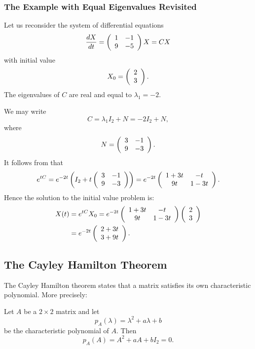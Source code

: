 \documentclass{ximera}
\begin{document}
\subsubsection*{The Example with Equal Eigenvalues Revisited}

Let us reconsider the system of differential equations 
\[
\frac{dX}{dt} = \left(\begin{array}{rr} 1 & -1\\ 9 &-5\end{array}\right) X = CX
\]
with initial value
\[
X_0 = \left(\begin{array}{r} 2 \\ 3\end{array}\right).
\]
The eigenvalues of $C$ are real and equal to $\lambda_1=-2$.

We may write
\[
C = \lambda_1 I_2 + N = -2I_2+N,
\]
where
\[
N = \left(\begin{array}{rr} 3 & -1\\ 9 &-3\end{array}\right).
\]
It follows from  that
\begin{equation}  \label{e:solntob}
e^{tC} =  e^{-2t}\left(I_2+t\left(\begin{array}{rr} 3 & -1\\ 9 &-3\end{array}\right)\right)
= e^{-2t}\left(\begin{array}{cc} 1+3t & -t\\ 9t &1-3t\end{array}\right).
\end{equation}
Hence the solution to the initial value problem is:
\begin{align*}
X(t) &= e^{tC}X_0 = e^{-2t}\left(\begin{array}{cc} 1+3t & -t\\ 9t &1-3t\end{array}\right)\left(\begin{array}{r} 2 \\ 3\end{array}\right) \\
  &= e^{-2t}\left(\begin{array}{r} 2+3t \\ 3+9t\end{array}\right).
\end{align*}

\subsection*{The Cayley Hamilton Theorem} 

The Cayley Hamilton theorem states that a matrix satisfies its own
characteristic polynomial.  More precisely:
\begin{theorem} \label{T:CH2}
Let $A$ be a $2\times 2$ matrix and let
\[
p_A(\lambda) = \lambda^2 + a\lambda + b
\]
be the characteristic polynomial of $A$.  Then
\[
p_A(A) = A^2 + aA + bI_2 = 0.
\]
\end{theorem}
\end{document}
